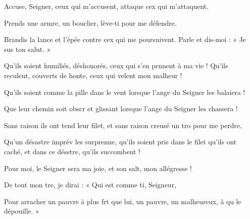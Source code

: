 \item Accuse, Seigner, ceux qui m’accusent,\psstar{} attaque cex qui m’attaquent.
\item Prends une armre, un bouclier,\psstar{} lève-ti pour me défendre.
\item Brandis la lance et l’épée contre cex qui me poursuivent.\psstar{} Parle et dis-moi : « Je sus ton salut. »
\item Qu’ils soient humiliés, déshonorés, ceux qui s’en prnnent à ma vie !\psstar{} Qu’ils reculent, couverts de honte, ceux qui velent mon malheur !
\item Qu’ils soient comme la pille dans le vent\psstar{} lorsque l’ange du Seigner les balaiera !
\item Que leur chemin soit obscr et glissant\psstar{} lorsque l’ange du Seigner les chassera !
\item Sans raison ils ont tend leur filet,\psstar{} et sans raison creusé un tro pour me perdre.
\item Qu’un désastre imprév les surprenne,\psstar{} qu’ils soient pris dans le filet qu’ils ont caché, et dans ce désstre, qu’ils succombent !
\item Pour moi, le Seigner sera ma joie,\psstar{} et son salt, mon allégresse !
\item De tout mon tre, je dirai :\psstar{} « Qui est comme ti, Seigneur,
\item Pour arracher un pauvre à plus frt que lui,\psstar{} un pauvre, un malheureux, à qu le dépouille. »